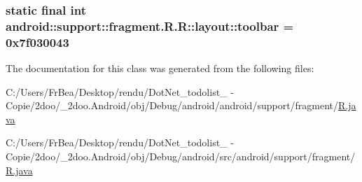 \hypertarget{classandroid_1_1support_1_1fragment_1_1_r_1_1layout_98a64594f2e3210cc248eee045c358f2}{
\subsubsection[{toolbar}]{\setlength{\rightskip}{0pt plus 5cm}static final int android::support::fragment.R.R::layout::toolbar = 0x7f030043}}
\label{classandroid_1_1support_1_1fragment_1_1_r_1_1layout_98a64594f2e3210cc248eee045c358f2}




The documentation for this class was generated from the following files:\begin{CompactItemize}
\item 
C:/Users/FrBea/Desktop/rendu/DotNet\_\-todolist\_ - Copie/2doo/\_\-2doo.Android/obj/Debug/android/android/support/fragment/\hyperlink{android_2support_2fragment_2_r_8java}{R.java}\item 
C:/Users/FrBea/Desktop/rendu/DotNet\_\-todolist\_ - Copie/2doo/\_\-2doo.Android/obj/Debug/android/src/android/support/fragment/\hyperlink{src_2android_2support_2fragment_2_r_8java}{R.java}\end{CompactItemize}
